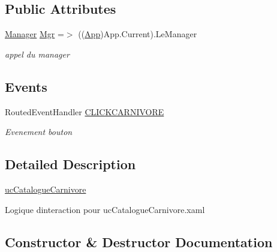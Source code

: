 \subsection*{Public Attributes}
\begin{DoxyCompactItemize}
\item 
\hyperlink{classModele_1_1Manager}{Manager} \hyperlink{classnewPizza1_1_1ucCatalogueCarnivore_a8115b482f70d652cf39951cacf7f0385}{Mgr} =$>$ ((\hyperlink{classnewPizza1_1_1App}{App})App.\+Current).Le\+Manager
\begin{DoxyCompactList}\small\item\em appel du manager \end{DoxyCompactList}\end{DoxyCompactItemize}
\subsection*{Events}
\begin{DoxyCompactItemize}
\item 
Routed\+Event\+Handler \hyperlink{classnewPizza1_1_1ucCatalogueCarnivore_aabd52f65bfac10cef62f30b909295d81}{C\+L\+I\+C\+K\+C\+A\+R\+N\+I\+V\+O\+RE}
\begin{DoxyCompactList}\small\item\em Evenement bouton \end{DoxyCompactList}\end{DoxyCompactItemize}


\subsection{Detailed Description}
\hyperlink{classnewPizza1_1_1ucCatalogueCarnivore}{uc\+Catalogue\+Carnivore} 

Logique d\textquotesingle{}interaction pour uc\+Catalogue\+Carnivore.\+xaml 

\subsection{Constructor \& Destructor Documentation}
\mbox{\label{classnewPizza1_1_1ucCatalogueCarnivore_a0afde1bb81e57eae28e9506ce89e0cf6}} 
